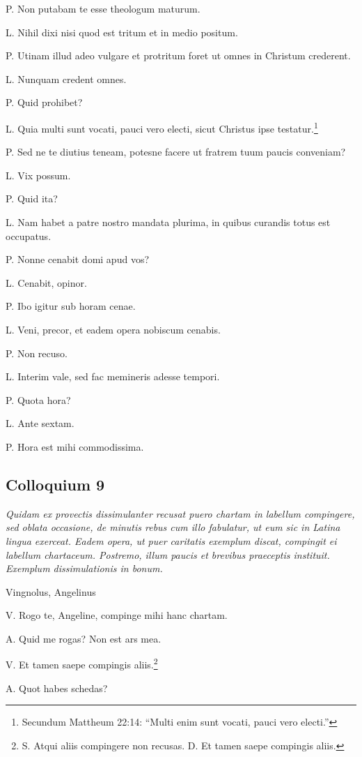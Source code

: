 \documentclass{article}
\begin{document}
P. Non putabam te esse theologum maturum. 

L. Nihil dixi nisi quod est tritum et in medio positum. 

P. Utinam illud adeo vulgare et protritum foret ut omnes in Christum crederent. 

L. Nunquam credent omnes. 

P. Quid prohibet?

L. Quia multi sunt vocati, pauci vero electi, sicut Christus ipse testatur.\footnote{Secundum Mattheum 22:14: ``Multi enim sunt vocati, pauci vero electi.”}

P. Sed ne te diutius teneam, potesne facere ut fratrem tuum paucis conveniam?

L. Vix possum. 

P. Quid ita?

L. Nam habet a patre nostro mandata plurima, in quibus curandis totus est occupatus. 

P. Nonne cenabit domi apud vos?

L. Cenabit, opinor. 

P. Ibo igitur sub horam cenae. 

L. Veni, precor, et eadem opera nobiscum cenabis. 

P. Non recuso. 

L. Interim vale, sed fac memineris adesse tempori. 

P. Quota hora?

L. Ante sextam. 

P. Hora est mihi commodissima.

\subsection{Colloquium 9}
\emph{Quidam ex provectis dissimulanter recusat puero chartam in labellum compingere, sed oblata occasione, de minutis rebus cum illo fabulatur, ut eum sic in Latina lingua exerceat. Eadem opera, ut puer caritatis exemplum discat, compingit ei labellum chartaceum. Postremo, illum paucis et brevibus praeceptis instituit. Exemplum dissimulationis in bonum.}

Vingnolus, Angelinus

V. Rogo te, Angeline, compinge mihi hanc chartam. 

A. Quid me rogas? Non est ars mea. 

V. Et tamen saepe compingis aliis.\footnote{S. Atqui aliis compingere non recusas. D. Et tamen saepe compingis aliis.}

A. Quot habes schedas?
\end{document}

